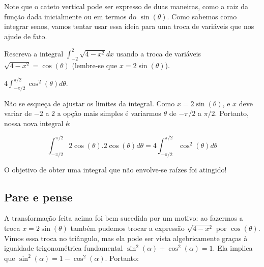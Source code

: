 \documentclass[main_estudante.tex]{subfiles}
\begin{document}
Note que o cateto vertical pode ser expresso de duas maneiras, como a raiz da função dada inicialmente ou em termos do $\sin(\theta)$. Como sabemos como integrar senos, vamos tentar usar essa ideia para uma troca de variáveis que nos ajude de fato.

\begin{questao}
Rescreva a integral $\int_{-2}^{2} \sqrt{4-x^2}dx$ usando a troca de variáveis $\sqrt{4-x^2}=\cos(\theta)$ (lembre-se que $x=2\sin(\theta)$).
\end{questao}


\begin{gabarito}
	\begin{gabaritoQuestao}
		$4 \int_{-\pi/2}^{\pi/2} \cos^2(\theta)d\theta$.
	\end{gabaritoQuestao}
\end{gabarito}

Não se esqueça de ajustar os limites da integral. Como $x=2\sin(\theta)$, e $x$ deve variar de $-2$ a $2$ a opção mais simples é variarmos $\theta$ de $-\pi/2$ a $\pi/2$. Portanto, nossa nova integral é:

$$\int_{-\pi/2}^{\pi/2} 2\cos(\theta). 2\cos(\theta)d\theta = 4 \int_{-\pi/2}^{\pi/2} \cos^2(\theta)d\theta$$

O objetivo de obter uma integral que não envolve-se raízes foi atingido!

\subsection*{Pare e pense}

A transformação feita acima foi bem sucedida por um motivo: ao fazermos a troca $x=2\sin(\theta)$ também pudemos trocar a expressão $\sqrt{4-x^2}$ por $\cos(\theta)$. Vimos essa troca no triângulo, mas ela pode ser vista algebricamente graças à igualdade trigonométrica fundamental $\sin^2(\alpha) + \cos^2(\alpha)=1$. Ela implica que $\sin^2(\alpha)=1-\cos^2(\alpha)$. Portanto:
\end{document}
